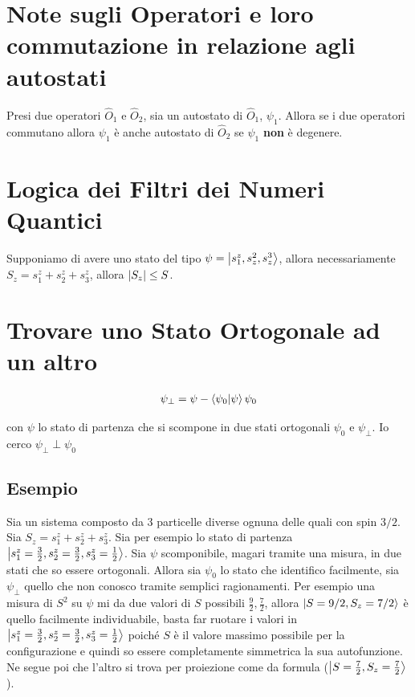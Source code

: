 
\section{Note sugli Operatori e loro commutazione in relazione agli autostati}

	Presi due operatori $\hat{O}_1$ e $\hat{O}_2$, sia un autostato di $\hat{O}_1$, $\psi_1$. Allora se i due operatori commutano allora $\psi_1$ è anche autostato di $\hat{O}_2$ se $\psi_1$ \textbf{non} è degenere.


\section{Logica dei Filtri dei Numeri Quantici}

	Supponiamo di avere uno stato del tipo $\psi = \ket{s_1^z, s_z^2, s_z^3}$, allora necessariamente $S_z = s_1^z + s_2^z + s_3^z$, allora $\qty|S_z| \leq S$.
	

\section{Trovare uno Stato Ortogonale ad un altro}

\begin{align*}
	\psi_{\perp} = \psi - \braket{\psi_0}{\psi} \psi_0
\end{align*}

	con $\psi$ lo stato di partenza che si scompone in due stati ortogonali $\psi_0$ e $\psi_{\perp}$. Io cerco $\psi_{\perp} \perp \psi_0$
	
\subsection{Esempio}

	Sia un sistema composto da 3 particelle diverse ognuna delle quali con spin $3/2$. Sia $S_z = s_1^z +s_2^z +s_3^z $. Sia per esempio lo stato di partenza $\ket{s_1^z = \frac{3}{2}, s_2^z = \frac{3}{2}, s_3^z = \frac{1}{2}}$. Sia $\psi$ scomponibile, magari tramite una misura, in due stati che so essere ortogonali. Allora sia $\psi_0$ lo stato che identifico facilmente, sia $\psi_{\perp}$ quello che non conosco tramite semplici ragionamenti. Per esempio una misura di $S^2$ su $\psi$ mi da due valori di $S$ possibili $\frac{9}{2}, \frac{7}{2}$, allora $\ket{S = 9/2, S_z = 7/2}$ è quello facilmente individuabile, basta far ruotare i valori in $\ket{s_1^z = \frac{3}{2}, s_2^z = \frac{3}{2}, s_3^z = \frac{1}{2}}$ poiché $S$ è il valore massimo possibile per la configurazione e quindi so essere completamente simmetrica la sua autofunzione. Ne segue poi che l'altro si trova per proiezione come da formula ($\ket{S = \frac{7}{2}, S_z = \frac{7}{2}}$).


